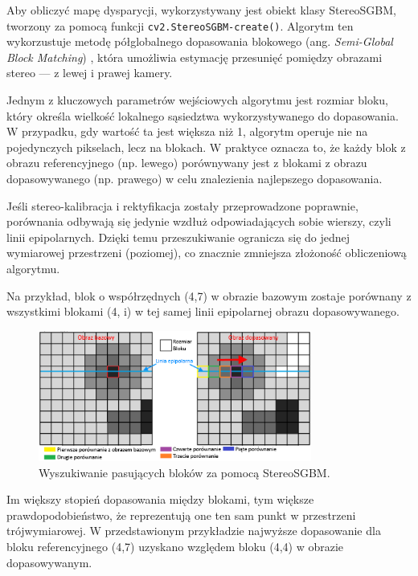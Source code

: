 \documentclass[magisterska]{pracadypl}
\begin{document}
Aby obliczyć mapę dysparycji, wykorzystywany jest obiekt klasy StereoSGBM, tworzony za pomocą funkcji \texttt{cv2.StereoSGBM-create()}. Algorytm ten wykorzustuje metodę półglobalnego dopasowania blokowego (ang. \textit{Semi-Global Block Matching}) \cite{semi-global}, która umożliwia estymację przesunięć pomiędzy obrazami stereo — z lewej i prawej kamery.

Jednym z kluczowych parametrów wejściowych algorytmu jest rozmiar bloku, który określa wielkość lokalnego sąsiedztwa wykorzystywanego do dopasowania. W przypadku, gdy wartość ta jest większa niż 1, algorytm operuje nie na pojedynczych pikselach, lecz na blokach. W praktyce oznacza to, że każdy blok z obrazu referencyjnego (np. lewego) porównywany jest z blokami z obrazu dopasowywanego (np. prawego) w celu znalezienia najlepszego dopasowania.

Jeśli stereo-kalibracja i rektyfikacja zostały przeprowadzone poprawnie, porównania odbywają się jedynie wzdłuż odpowiadających sobie wierszy, czyli linii epipolarnych. Dzięki temu przeszukiwanie ogranicza się do jednej wymiarowej przestrzeni (poziomej), co znacznie zmniejsza złożoność obliczeniową algorytmu.

Na przykład, blok o współrzędnych (4,7) w obrazie bazowym zostaje porównany z wszystkimi blokami (4, i) w tej samej linii epipolarnej obrazu dopasowywanego.

\begin{figure}[H]
\centering
\includegraphics[width=0.8\textwidth]{images/dopracy1.png}
\captionsetup{font=footnotesize}
\caption[Wyszukiwanie pasujących bloków za pomocą StereoSGBM. Opracowanie własne.]{Wyszukiwanie pasujących bloków za pomocą StereoSGBM.}
\end{figure}

Im większy stopień dopasowania między blokami, tym większe prawdopodobieństwo, że reprezentują one ten sam punkt w przestrzeni trójwymiarowej. W przedstawionym przykładzie najwyższe dopasowanie dla bloku referencyjnego (4,7) uzyskano względem bloku (4,4) w obrazie dopasowywanym.
\end{document}
